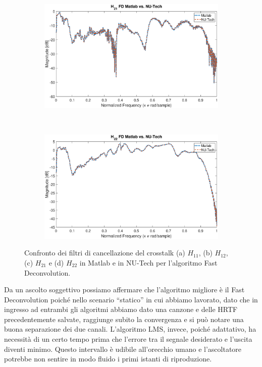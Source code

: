 \documentclass[12pt,a4paper,titlepage]{article}
\begin{document}
\begin{figure}[h]
	\ContinuedFloat
	\centering
	\begin{subfigure}{1\textwidth}
		\includegraphics[width=1\textwidth]{Immagini/H21_FD_matlab_nutech}
		\caption{}
		\label{fig:H21_FD_matlab_nutech}
	\end{subfigure}\\
	\begin{subfigure}{1\textwidth}
		\includegraphics[width=1\textwidth]{Immagini/H22_FD_matlab_nutech}
		\caption{}
		\label{fig:H22_FD_matlab_nutech}
	\end{subfigure}
		\caption{Confronto dei filtri di cancellazione del crosstalk (a) $H_{11}$, (b) $H_{12}$, (c) $H_{21}$ e (d) $H_{22}$ in Matlab e in NU-Tech per l'algoritmo Fast Deconvolution.}
		\label{fig:confronto_filtri_matlab_nutech_fd}
\end{figure}

Da un ascolto soggettivo possiamo affermare che l'algoritmo migliore è il Fast Deconvolution poiché nello scenario ``statico'' in cui abbiamo lavorato, dato che in ingresso ad entrambi gli algoritmi abbiamo dato una canzone e delle HRTF precedentemente salvate, raggiunge subito la convergenza e si può notare una buona separazione dei due canali. L'algoritmo LMS, invece, poiché adattativo, ha necessità di un certo tempo prima che l'errore tra il segnale desiderato e l'uscita diventi minimo. Questo intervallo è udibile all'orecchio umano e l'ascoltatore potrebbe non sentire in modo fluido i primi istanti di riproduzione.
\end{document}
